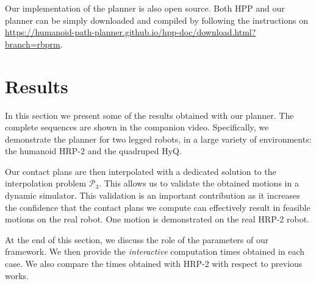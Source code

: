 \documentclass[journal]{IEEEtran}
\providecommand{\DIFaddtex}[1]{#1} %
\providecommand{\DIFdeltex}[1]{} %
\providecommand{\DIFaddbegin}{\protect\color{blue}} %
\providecommand{\DIFaddend}{\protect\color{black}} %
\providecommand{\DIFdelbegin}{\protect\cbdelete} %
\providecommand{\DIFdelend}{} %
\providecommand{\DIFadd}[1]{\texorpdfstring{\DIFaddtex{#1}}{#1}} %
\providecommand{\DIFdel}[1]{\texorpdfstring{\DIFdeltex{#1}}{}} %
\begin{document}
\DIFadd{Our implementation of the planner is also open source.
Both HPP and our planner can be simply downloaded and compiled by following the instructions on
}\url{https://humanoid-path-planner.github.io/hpp-doc/download.html?branch=rbprm}\DIFadd{. 
}\DIFaddend \section{Results}
\label{sec:results}
In this section we present some of the results obtained with our planner. The complete sequences are shown in the companion video.
Specifically, we demonstrate the planner for two legged robots, in a large variety of environments: the humanoid HRP-2 and the quadruped HyQ.
\DIFdelbegin \DIFdel{Finally, a last example suggests possible applications to dexterous manipulation.
}\DIFdelend %

\DIFdelbegin \DIFdel{At the end of the video, we validate our contact plans by exhibiting a }\DIFdelend \DIFaddbegin \DIFadd{Our contact plans are then interpolated with a dedicated }\DIFaddend solution to the interpolation problem $\mathcal{P}_3$. \DIFaddbegin \DIFadd{This allows us to validate the obtained
motions in a dynamic simulator. This validation is an important contribution as it increases the confidence that the contact plans we compute can effectively
result in feasible motions on the real robot. One motion is demonstrated on the real HRP-2 robot.
}\DIFaddend 

At the end of this section, we discuss the role of the parameters of our framework. We then provide the \textit{interactive} computation times obtained in each case.
We also compare the times obtained with HRP-2 with respect to previous works.
\end{document}
